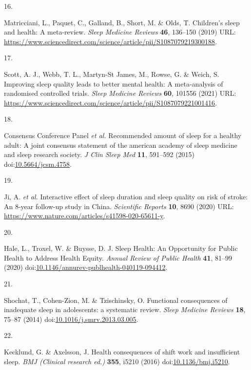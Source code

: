 \documentclass[
  10pt,
]{scrbook}
\newlength{\cslhangindent}
\newlength{\csllabelwidth}
\newlength{\cslentryspacingunit} %
\newenvironment{CSLReferences}[2] %
 {%
  \setlength{\parindent}{0pt}
  \ifodd #1
  \let\oldpar\par
  \def\par{\hangindent=\cslhangindent\oldpar}
  \fi
  \setlength{\parskip}{#2\cslentryspacingunit}
 }%
 {}
\newcommand{\CSLLeftMargin}[1]{\parbox[t]{\csllabelwidth}{#1}}
\newcommand{\CSLRightInline}[1]{\parbox[t]{\linewidth - \csllabelwidth}{#1}\break}
\begin{document}
\begin{CSLReferences}{0}{0}
\leavevmode{}%
\CSLLeftMargin{16. }%
\CSLRightInline{Matricciani, L., Paquet, C., Galland, B., Short, M. \&
Olds, T. Children's sleep and health: A meta-review. \emph{Sleep
Medicine Reviews} \textbf{46}, 136--150 (2019) URL:
\url{https://www.sciencedirect.com/science/article/pii/S1087079219300188}.}

\leavevmode{}%
\CSLLeftMargin{17. }%
\CSLRightInline{Scott, A. J., Webb, T. L., Martyn-St James, M., Rowse,
G. \& Weich, S. Improving sleep quality leads to better mental health: A
meta-analysis of randomised controlled trials. \emph{Sleep Medicine
Reviews} \textbf{60}, 101556 (2021) URL:
\url{https://www.sciencedirect.com/science/article/pii/S1087079221001416}.}

\leavevmode{}%
\CSLLeftMargin{18. }%
\CSLRightInline{Consensus Conference Panel \emph{et al.} Recommended
amount of sleep for a healthy adult: A joint consensus statement of the
american academy of sleep medicine and sleep research society. \emph{J
Clin Sleep Med} \textbf{11}, 591--592 (2015)
doi:\href{https://doi.org/10.5664/jcsm.4758}{10.5664/jcsm.4758}.}

\leavevmode{}%
\CSLLeftMargin{19. }%
\CSLRightInline{Ji, A. \emph{et al.} Interactive effect of sleep
duration and sleep quality on risk of stroke: An 8-year follow-up study
in China. \emph{Scientific Reports} \textbf{10}, 8690 (2020) URL:
\url{https://www.nature.com/articles/s41598-020-65611-y}.}

\leavevmode{}%
\CSLLeftMargin{20. }%
\CSLRightInline{Hale, L., Troxel, W. \& Buysse, D. J. Sleep Health: An
Opportunity for Public Health to Address Health Equity. \emph{Annual
Review of Public Health} \textbf{41}, 81--99 (2020)
doi:\href{https://doi.org/10.1146/annurev-publhealth-040119-094412}{10.1146/annurev-publhealth-040119-094412}.}

\leavevmode{}%
\CSLLeftMargin{21. }%
\CSLRightInline{Shochat, T., Cohen-Zion, M. \& Tzischinsky, O.
Functional consequences of inadequate sleep in adolescents: a systematic
review. \emph{Sleep Medicine Reviews} \textbf{18}, 75--87 (2014)
doi:\href{https://doi.org/10.1016/j.smrv.2013.03.005}{10.1016/j.smrv.2013.03.005}.}

\leavevmode{}%
\CSLLeftMargin{22. }%
\CSLRightInline{Kecklund, G. \& Axelsson, J. Health consequences of
shift work and insufficient sleep. \emph{BMJ (Clinical research ed.)}
\textbf{355}, i5210 (2016)
doi:\href{https://doi.org/10.1136/bmj.i5210}{10.1136/bmj.i5210}.}


\end{CSLReferences}
\end{document}
